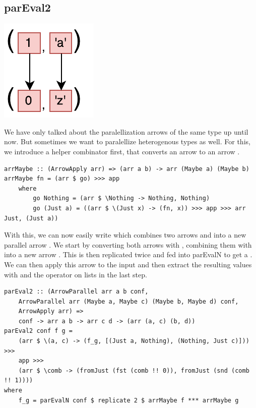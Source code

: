 \subsection{parEval2}
\begin{center}
	\includegraphics[scale=0.7]{images/parEval2}
\end{center}
We have only talked about the paralellization arrows of the same type up until now. But sometimes we want to paralellize heterogenous types as well. For this, we introduce a helper combinator  first, that converts an arrow  to an arrow .
\begin{lstlisting}[frame=htrbl]
arrMaybe :: (ArrowApply arr) => (arr a b) -> arr (Maybe a) (Maybe b)
arrMaybe fn = (arr $ go) >>> app
	where 
		go Nothing = (arr $ \Nothing -> Nothing, Nothing)
		go (Just a) = ((arr $ \(Just x) -> (fn, x)) >>> app >>> arr Just, (Just a))
\end{lstlisting}
With this, we can now easily write  which combines two arrows  and  into a new parallel arrow . We start by converting both arrows with , combining them with \code{***} into a new arrow . This is then replicated twice and fed into parEvalN to get a . We can then apply this arrow to the input  and then extract the resulting values with  and the \code{!!} operator on lists in the last step.
\begin{lstlisting}[frame=htrbl]
parEval2 :: (ArrowParallel arr a b conf,
	ArrowParallel arr (Maybe a, Maybe c) (Maybe b, Maybe d) conf,
	ArrowApply arr) =>
	conf -> arr a b -> arr c d -> (arr (a, c) (b, d))
parEval2 conf f g =
	(arr $ \(a, c) -> (f_g, [(Just a, Nothing), (Nothing, Just c)])) >>>
	app >>>
	(arr $ \comb -> (fromJust (fst (comb !! 0)), fromJust (snd (comb !! 1))))
where
	f_g = parEvalN conf $ replicate 2 $ arrMaybe f *** arrMaybe g
\end{lstlisting}